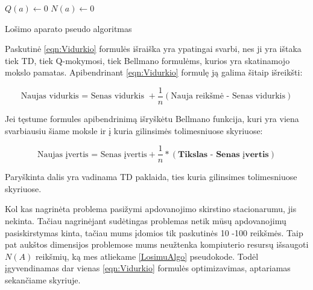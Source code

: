 \documentclass[a4paper, 12pt]{article}
\begin{document}
\begin{algorithm}[H]
\label{LosimuAlgo}
\SetAlgoLined

$Q(a) \leftarrow 0$\;
$N(a) \leftarrow 0$\;

 \caption{Lošimo aparato pseudo algoritmas}
\end{algorithm}


Paskutinė \ref{eqn:Vidurkio} formulės išraiška yra ypatingai svarbi, nes ji yra ištaka tiek TD, tiek Q-mokymosi, tiek Bellmano formulėms, kurios yra skatinamojo mokslo pamatas. Apibendrinant \ref{eqn:Vidurkio} formulę ją galima šitaip išreikšti:

\begin{equation}
\text{Naujas vidurkis = Senas vidurkis }+ \frac{1}{n} (\text{Nauja reikšmė - Senas vidurkis})
\end{equation}

Jei tęstume formules apibendrinimą išryškėtu Bellmano funkcija, kuri yra viena svarbiausiu šiame moksle ir į kuria gilinsimės tolimesniuose skyriuose:

\begin{equation}
\label{TDLietuviskai}
\text{Naujas įvertis = Senas įvertis}+ \frac{1}{n} * (\textbf{Tikslas - Senas įvertis})
\end{equation}

Paryškinta dalis yra vadinama TD paklaida, ties kuria gilinsimes tolimesniuose skyriuose.

Kol kas nagrinėta problema pasižymi apdovanojimo skirstino stacionarumu, jis nekinta. Tačiau nagrinėjant sudėtingas problemas netik mūsų apdovanojimų pasiskirstymas kinta, tačiau mums įdomios tik paskutinės 10 -100 reikšmės. Taip pat aukštos dimensijos problemose mums neužtenka kompiuterio resursų išsaugoti $N(A)$ reikšmių, ką mes atliekame \ref{LosimuAlgo} pseudokode. Todėl įgyvendinamas dar vienas \ref{eqn:Vidurkio} formulės optimizavimas, aptariamas sekančiame skyriuje.
\end{document}
